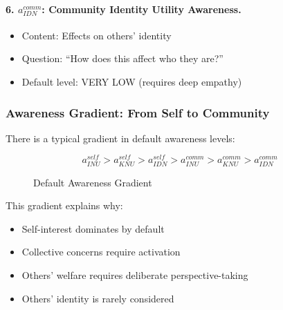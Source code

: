 \paragraph{6. $a^{comm}_{IDN}$: Community Identity Utility Awareness.}
\begin{itemize}
\item Content: Effects on others' identity
\item Question: ``How does this affect who they are?''
\item Default level: VERY LOW (requires deep empathy)
\end{itemize}

\subsubsection{Awareness Gradient: From Self to Community}

There is a typical gradient in default awareness levels:

\begin{equation}
a^{self}_{INU} > a^{self}_{KNU} > a^{self}_{IDN} > a^{comm}_{INU} > a^{comm}_{KNU} > a^{comm}_{IDN}
\end{equation}

\begin{figure}[htbp]
\centering
{}
\caption{Default Awareness Gradient}
\label{fig:awareness-gradient}
\end{figure}

This gradient explains why:
\begin{itemize}
\item Self-interest dominates by default
\item Collective concerns require activation
\item Others' welfare requires deliberate perspective-taking
\item Others' identity is rarely considered
\end{itemize}

